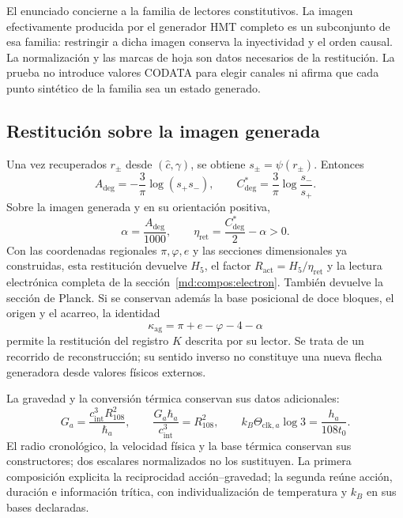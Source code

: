 El enunciado concierne a la familia de lectores constitutivos. La imagen
efectivamente producida por el generador HMT completo es un subconjunto de
esa familia: restringir a dicha imagen conserva la inyectividad y el orden
causal. La normalización y las marcas de hoja son datos necesarios de la
restitución. La prueba no introduce valores CODATA para elegir canales ni
afirma que cada punto sintético de la familia sea un estado generado.

\subsection{Restitución sobre la imagen generada}
\label{md:compos:restitucion-completa}

Una vez recuperados $r_\pm$ desde $(\widehat c,\gamma)$, se obtiene
$s_\pm=\psi(r_\pm)$. Entonces
\begin{equation}
 A_{\deg}=-\frac{3}{\pi}\log(s_+s_-),\qquad
 C^*_{\deg}=\frac{3}{\pi}\log\frac{s_-}{s_+}.
 \label{md:compos:restitucion-angular}
\end{equation}
Sobre la imagen generada y en su orientación positiva,
\begin{equation}
 \alpha=\frac{A_{\deg}}{1000},\qquad
 \eta_{\mathrm{ret}}=\frac{C^*_{\deg}}{2}-\alpha>0.
 \label{md:compos:restitucion-alpha-eta}
\end{equation}
Con las coordenadas regionales $\pi,\varphi,e$ y las secciones dimensionales
ya construidas, esta restitución devuelve $H_5$, el factor
$R_{\mathrm{act}}=H_5/\eta_{\mathrm{ret}}$ y la lectura electrónica completa
de la sección~\ref{md:compos:electron}. También devuelve la sección de
Planck. Si se conservan además la base posicional de doce bloques, el origen
y el acarreo, la identidad
\begin{equation}
 \kappa_{\mathrm{ag}}=\pi+e-\varphi-4-\alpha
 \label{md:compos:restitucion-k}
\end{equation}
permite la restitución del registro $K$ descrita por su lector. Se trata de
un recorrido de reconstrucción; su sentido inverso no constituye una nueva
flecha generadora desde valores físicos externos.

La gravedad y la conversión térmica conservan sus datos adicionales:
\begin{equation}
 G_a=\frac{c_{\mathrm{int}}^3R_{108}^2}{\hbar_a},\qquad
 \frac{G_a\hbar_a}{c_{\mathrm{int}}^3}=R_{108}^2,
 \qquad
 k_B\Theta_{\mathrm{clk},a}\log3=\frac{h_a}{108t_0}.
 \label{md:compos:gravedad-termica}
\end{equation}
El radio cronológico, la velocidad física y la base térmica conservan sus
constructores; dos escalares normalizados no los sustituyen. La primera
composición explicita la reciprocidad acción--gravedad; la segunda reúne
acción, duración e información trítica, con individualización de temperatura
y $k_B$ en sus bases declaradas.

